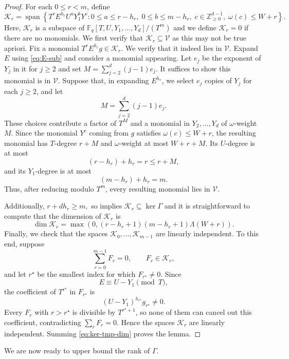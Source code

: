 \documentclass[11pt]{article}
\newcommand{\F}{\mathbb F}
\let \cref \Cref
\begin{document}
\begin{proof}For each $0\le r<m$, define
\[
\mathcal K_r
=
\operatorname{span}
\left\{
T^rE^{h_r}U^aY_1^bY^c:
0\le a\le r-h_r,\;
0\le b\le m-h_r,\;
c\in\mathbb Z_{\ge0}^{d-1},\;
\omega(c)\le W+r
\right\}.
\]
Here, $\mathcal{K}_r$ is a subspace of $\F_q[T,U,Y_1,\ldots,Y_d]/(T^m)$ and we define $\mathcal K_r=0$ if there are no monomials. We first verify that $\mathcal K_r\subseteq\mathcal V$ as this may not be true apriori. Fix a monomial $T^rE^{h_r}g\in\mathcal K_r$. We verify that it indeed lies in $\mathcal{V}$. Expand $E$ using \eqref{eq:E-sub} and consider a monomial appearing. Let
$e_j$ be the exponent of $Y_j$ in it for $j \geq 2$ and set $M=\sum_{j=2}^d(j-1)e_j.$ It suffices to show this monomial is in $\mathcal{V}$. Suppose that, in expanding $E^{h_r}$, we select $e_j$ copies of $Y_j$
for each $j\ge2$, and let
\[
M=\sum_{j=2}^d (j-1)e_j.
\]
These choices contribute a factor of $T^M$ and a monomial in
$Y_2,\ldots,Y_d$ of $\omega$-weight $M$. Since the monomial $Y^c$
coming from $g$ satisfies $\omega(c)\le W+r$, the resulting monomial
has $T$-degree $r+M$ and $\omega$-weight at most $W+r+M$. Its $U$-degree is at most
\[
(r-h_r)+h_r=r\le r+M,
\]
and its $Y_1$-degree is at most
\[
(m-h_r)+h_r=m.
\]
Thus, after reducing modulo $T^m$, every resulting monomial lies in
$\mathcal V$.

Additionally, $r+dh_r\ge m,$
so \cref{lem:kernel-criterion} implies $\mathcal K_r\subseteq\ker\Gamma$ and it is straightforward to compute that the dimension of $\mathcal K_r$ is
\begin{equation}\label{eq:ker-tmp-dim}
\dim\mathcal K_r
=
\max(0, (r-h_r+1)(m-h_r+1)\Lambda(W+r)).
\end{equation}
Finally, we check that the spaces $\mathcal K_0,\ldots,\mathcal K_{m-1}$ are linearly
independent. To this end, suppose
\[
\sum_{r=0}^{m-1}F_r=0,
\qquad
F_r\in\mathcal K_r,
\]
and let $r^\star$ be the smallest index for which
$F_{r^\star}\ne0$. Since
\[
E\equiv U-Y_1\pmod T,
\]
the coefficient of $T^{r^\star}$ in $F_{r^\star}$ is
\[
(U-Y_1)^{h_{r^\star}}g_{r^\star}\ne0.
\]
Every $F_r$ with $r>r^\star$ is divisible by $T^{r^\star+1}$, so none of them can cancel out this coefficient, contradicting
$\sum_rF_r=0$. Hence the spaces $\mathcal K_r$ are linearly independent. Summing \eqref{eq:ker-tmp-dim} proves the lemma.
\end{proof}
We are now ready to upper bound the rank of $\Gamma$.
\end{document}
